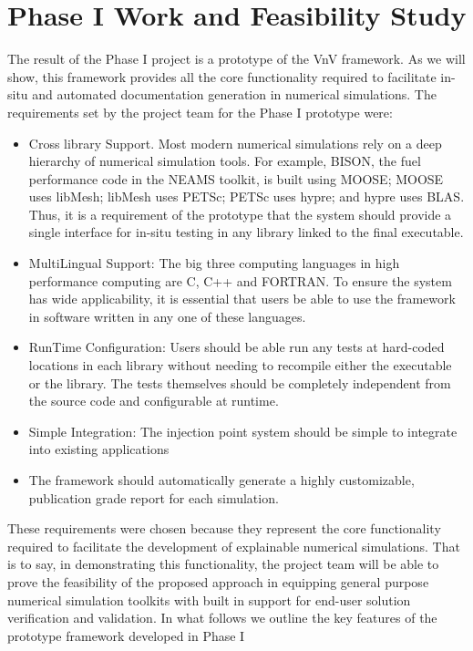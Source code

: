 \section{Phase I Work and Feasibility Study}

The result of the Phase I project is a prototype of the VnV framework. As we will show,
this framework provides all the core functionality required to facilitate in-situ \VV and automated 
documentation generation in numerical simulations. The requirements set by the project team for the Phase I prototype were:

\begin{itemize}
 \item Cross library Support. Most modern numerical simulations rely on a deep hierarchy of numerical simulation tools. For example, BISON, the fuel performance code in the NEAMS toolkit, is built using MOOSE; MOOSE uses libMesh; libMesh uses PETSc; PETSc uses hypre; and hypre uses BLAS. Thus, it is a requirement of the prototype that the system should provide a single interface for in-situ testing in any library linked to the final executable. 
 \item MultiLingual Support: The big three computing languages in high performance computing are C, C++ and FORTRAN. To ensure the system has wide applicability, it is essential that users be able to use the framework in software written in any one of these languages. 
 \item RunTime Configuration: Users should be able run any \VV tests at hard-coded locations in each library without needing to recompile either the executable or the library. The tests themselves should be completely independent from the source code and configurable at runtime. 
 \item Simple Integration: The injection point system should be simple to integrate into existing applications
 \item The framework should automatically generate a highly customizable, publication grade \VV report for each simulation. 
\end{itemize}

These requirements were chosen because they represent the core functionality required to facilitate the development of explainable numerical simulations. That is to say, in demonstrating this functionality, the project team will be able to prove the feasibility of the proposed approach in equipping general purpose numerical simulation toolkits with built in support for end-user solution verification and validation. In what follows we outline the key features of the prototype framework developed in Phase I

